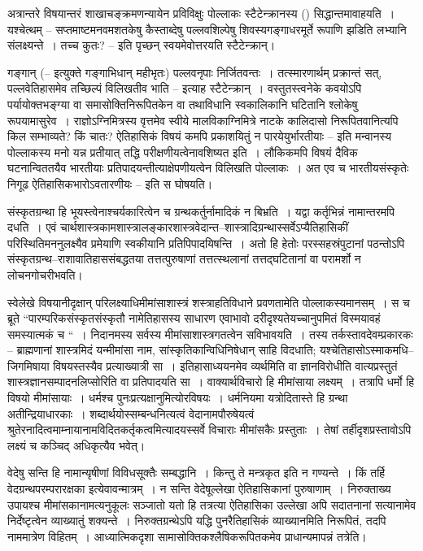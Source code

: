 अत्रान्तरे विषयान्तरं शाखाचङ्क्रमणन्यायेन प्रविविक्षुः पोल्लाकः स्टैटेन्क्रानस्य () सिद्धान्तमावाहयति~। यश्चेत्थम् – सप्तमाष्टमनवमशतकेषु कैस्ताब्देषु पल्लवशिल्पेषु शिवस्य\break गङ्गाधरमूर्ते रूपाणि झडिति लभ्यानि संलक्ष्यन्ते~। तच्च कुतः? – इति पृच्छन् स्वयमेवोत्तरयति स्टैटेन्क्रान्।

गङ्गान् (– इत्युक्ते गङ्गाभिधान् महीभृतः) पल्लवनृपाः निर्जितवन्तः~। तत्स्मारणार्थम् प्रक्रान्तं सत्, पल्लवेतिहासमेव तच्छिल्पं विलिखतीव भाति – इत्याह स्टैटेन्क्रान्~। वस्तुतस्त्वनेके कवयोऽपि पर्यायोक्तभङ्ग्या वा समासोक्तिनिरूपितकेन वा तथाविधानि स्वकालिकानि घटितानि श्लोकेषु रूपयामासुरेव~। राज्ञोऽग्निमित्रस्य वृत्तमेव स्वीये मालविकाग्निमित्रे नाटके कालिदासो निरूपितवानित्यपि किल सम्भाव्यते? किं चातः? ऐतिहासिकं विषयं कमपि प्रकाशयितुं न पारयेयुर्भारतीयाः – इति मन्वानस्य पोल्लाकस्य मनो यन्न प्रतीयात् तद्धि परीक्षणीयत्वेनावशिष्यत इति~। लौकिकमपि विषयं दैविक घटनान्विततयैव भारतीयाः प्रतिपादयन्तीत्याक्षेपणीयत्वेन विलिखति पोल्लाकः~। अत एव च भारतीयसंस्कृतेः निगूढ ऐतिहासिकभारोऽवतारणीयः – इति स घोषयति।

संस्कृतग्रन्था हि भूयस्त्वेनाश्चर्यकारित्वेन च ग्रन्थकर्तुर्नामादिकं न बिभ्रति~। यद्वा कर्तृभिन्नं नामान्तरमपि दधति~। एवं चार्थशास्त्रकामशास्त्रालङ्कारशास्त्रवेदान्त–शास्त्रादिग्रन्थास्सर्वेऽप्यैतिहासिकीं परिस्थितिमननुलक्ष्यैव प्रमेयाणि स्वकीयानि प्रतिपिपादयिषन्ति~। अतो हि हेतोः परस्सहस्रं\break पुटानां पठन्तोऽपि संस्कृतग्रन्थ–राशावातिहाससंबद्धतया तत्तत्पुरुषाणां तत्तत्स्थलानां तत्तद्घटितानां वा परामर्शो न लोचनगोचरीभवति।

स्वेलेखे विषयानीदृक्षान् परिलक्ष्याधिमीमांसाशास्त्रं शस्त्राहतिविधाने प्रवणतामेति पोल्लाकस्य\break मानसम्~। स च ब्रूते “पारम्परिकसंस्कृतसंस्कृतौ नामेतिहासस्य साधारण एवाभावो दरीदृश्यते\break यच्चानुपमितं विस्मयावहं समस्यात्मकं च “~। निदानमस्य सर्वस्य मीमांसाशास्त्रगतत्वेन स\break विभावयति~। तस्य तर्कस्तावदेवम्प्रकारकः – ब्राह्मणानां शास्त्रमिदं यन्मीमांसा नाम, सांस्कृतिकान्\break विधिनिषेधान् साहि विदधाति; यश्चेतिहासोऽस्माकमधि–जिगमिषाया विषयस्तस्यैव प्रत्याख्यात्री सा~। इतिहासाध्ययनमेव व्यर्थमिति वा ज्ञानविरोधीति वात्यप्रस्तुतं शास्त्रज्ञानसम्पादनलिप्सोरिति वा प्रतिपादयति सा~। वाक्यार्थविचारो हि मीमांसाया लक्ष्यम्~। तत्रापि धर्मो हि विषयो मीमांसायाः~। धर्मश्च पुनःप्रत्यक्षानुमित्योरविषयः~। धर्मनियमा यत्रोदितास्ते हि ग्रन्था अतीन्द्रियाधारकाः~। शब्दार्थयोस्सम्बन्धनित्यत्वं वेदानामपौरुषेयत्वं श्रुतेरनादित्वमाम्नायानामविदितकर्तृकत्वमित्यादयस्सर्वे विचाराः मीमांसकैः प्रस्तुताः~। तेषां तर्हीदृशप्रस्तावोऽपि लक्ष्यं च कञ्चिद् अधिकृत्यैव भवेत्।

वेदेषु सन्ति हि नामान्यृषीणां विविधसूक्तैः सम्बद्धानि~। किन्तु ते मन्त्रकृत इति न गण्यन्ते~। किं तर्हि वेदग्रन्थपरम्परारक्षका इत्येवावन्मात्रम्~। न सन्ति वेदेषूल्लेखा ऐतिहासिकानां पुरुषाणाम्~। निरुक्ताख्य उपायश्च मीमांसकानामत्यनुकूलः सञ्जातो यतो हि तत्रत्या ऐतिहासिका उल्लेखा अपि सदातनानां सत्यानामेव निर्देष्टृत्वेन व्याख्यातुं शक्यन्ते~। निरुक्तग्रन्थेऽपि यद्धि पुनरैतिहासिकं व्याख्यानमिति निरूपितं, तदपि नाममात्रेण विहितम्~। आध्यात्मिकदृशा सामासोक्तिकश्लैषिकरूपितकमेव प्राधान्यमापन्नं तत्रेति।

